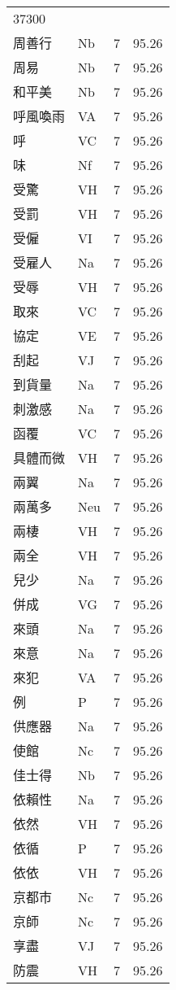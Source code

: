 \documentclass[twocolumn]{book}
\begin{document}
\begin{supertabular}{llrr}
37300\\
周善行 & Nb & 7 &  95.26\\
周易 & Nb & 7 &  95.26\\
和平美 & Nb & 7 &  95.26\\
呼風喚雨 & VA & 7 &  95.26\\
呼 & VC & 7 &  95.26\\
味 & Nf & 7 &  95.26\\
受驚 & VH & 7 &  95.26\\
受罰 & VH & 7 &  95.26\\
受僱 & VI & 7 &  95.26\\
受雇人 & Na & 7 &  95.26\\
受辱 & VH & 7 &  95.26\\
取來 & VC & 7 &  95.26\\
協定 & VE & 7 &  95.26\\
刮起 & VJ & 7 &  95.26\\
到貨量 & Na & 7 &  95.26\\
刺激感 & Na & 7 &  95.26\\
函覆 & VC & 7 &  95.26\\
具體而微 & VH & 7 &  95.26\\
兩翼 & Na & 7 &  95.26\\
兩萬多 & Neu & 7 &  95.26\\
兩棲 & VH & 7 &  95.26\\
兩全 & VH & 7 &  95.26\\
兒少 & Na & 7 &  95.26\\
併成 & VG & 7 &  95.26\\
來頭 & Na & 7 &  95.26\\
來意 & Na & 7 &  95.26\\
來犯 & VA & 7 &  95.26\\
例 & P & 7 &  95.26\\
供應器 & Na & 7 &  95.26\\
使館 & Nc & 7 &  95.26\\
佳士得 & Nb & 7 &  95.26\\
依賴性 & Na & 7 &  95.26\\
依然 & VH & 7 &  95.26\\
依循 & P & 7 &  95.26\\
依依 & VH & 7 &  95.26\\
京都市 & Nc & 7 &  95.26\\
京師 & Nc & 7 &  95.26\\
享盡 & VJ & 7 &  95.26\\
防震 & VH & 7 &  95.26\\

\end{supertabular}
\end{document}
